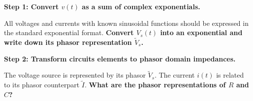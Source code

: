 \begin{enumerate}

\qitem \textbf{Step 1: Convert $v(t)$ as a sum of complex exponentials.}

All voltages and currents with known sinusoidal functions should be expressed in the standard exponential format.
\textbf{Convert $V_s(t)$ into an exponential and write down its phasor representation $\widetilde{V}_s$.}

\ws{\vspace{100px}}




\qitem \textbf{Step 2: Transform circuits elements to phasor domain impedances.}

The voltage source is represented by its phasor $\widetilde{V}_s$.
The current $i(t)$ is related to its phasor counterpart $\widetilde{I}$. 
\textbf{What are the phasor representations of $R$ and $C$?}


\end{enumerate}
